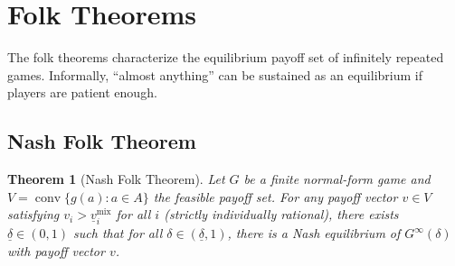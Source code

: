 \documentclass[11pt,a4paper]{article}
\theoremstyle{definition}
\theoremstyle{plain}
\newtheorem{theorem}{Theorem}[section]
\theoremstyle{remark}
\DeclareMathOperator{\conv}{conv}
\begin{document}
\section{Folk Theorems}
\label{sec:folk-theorems}

The folk theorems characterize the equilibrium payoff set of infinitely repeated games.
Informally, ``almost anything'' can be sustained as an equilibrium if players are patient
enough.

\subsection{Nash Folk Theorem}

\begin{theorem}[Nash Folk Theorem]
\label{thm:nash-folk}
Let $G$ be a finite normal-form game and $V = \conv\{g(a) : a \in A\}$ the feasible payoff
set. For any payoff vector $v \in V$ satisfying $v_i > \underline{v}_i^{\text{mix}}$ for
all $i$ (strictly individually rational), there exists $\underline{\delta} \in (0,1)$ such
that for all $\delta \in (\underline{\delta}, 1)$, there is a Nash equilibrium of
$G^\infty(\delta)$ with payoff vector $v$.
\end{theorem}
\end{document}
